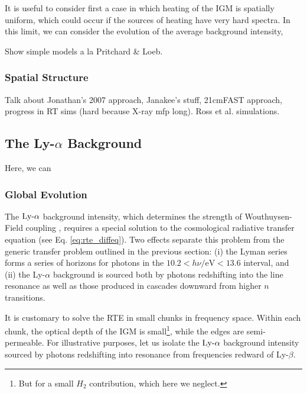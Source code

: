 It is useful to consider first a case in which heating of the IGM is spatially uniform, which could occur if the sources of heating have very hard spectra. In this limit, we can consider the evolution of the average background intensity,



Show simple models a la Pritchard \& Loeb.



\subsubsection{Spatial Structure} \label{sec:temperature_local}



Talk about Jonathan's 2007 approach, Janakee's stuff, 21cmFAST approach, progress in RT sims (hard because X-ray mfp long). Ross et al. simulations.



\subsection{The Ly-$\alpha$ Background}
Here, we can 


\subsubsection{Global Evolution}
The $\text{Ly-}\alpha$ background intensity, which determines the strength of Wouthuysen-Field coupling \cite{Wouthuysen1952, Field1958}, requires a special solution to the cosmological radiative transfer equation (see Eq. \ref{eq:rte_diffeq}). Two effects separate this problem from the generic transfer problem outlined in the previous section: (i) the Lyman series forms a series of horizons for photons in the $10.2 < h \nu / \mathrm{eV} < 13.6$ interval, and (ii) the Ly-$\alpha$ background is sourced both by photons redshifting into the line resonance as well as those produced in cascades downward from higher $n$ transitions.

It is customary to solve the RTE in small chunks in frequency space. Within each chunk, the optical depth of the IGM is small\footnote{But for a small $H_2$ contribution, which here we neglect.}, while the edges are semi-permeable. For illustrative purposes, let us isolate the $\text{Ly-}\alpha$ background intensity sourced by photons redshifting into resonance from frequencies redward of Ly-$\beta$.


